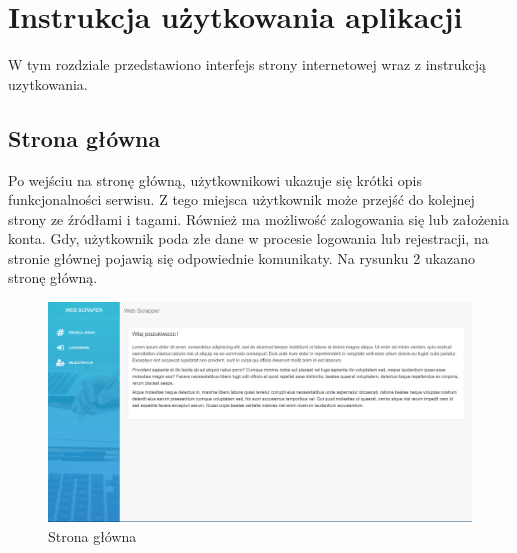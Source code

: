 \documentclass[12pt, titlepage]{article}
\begin{document}
	\newpage
	\section{Instrukcja użytkowania aplikacji}
	W tym rozdziale przedstawiono interfejs strony internetowej wraz z instrukcją uzytkowania.
	\subsection{Strona główna}
	Po wejściu na stronę główną, użytkownikowi ukazuje się krótki opis funkcjonalności serwisu. Z tego miejsca użytkownik może przejść do kolejnej strony ze źródłami i tagami. Również ma możliwość zalogowania się lub założenia konta. Gdy, użytkownik poda złe dane w procesie logowania lub rejestracji, na stronie głównej pojawią się odpowiednie komunikaty. Na rysunku 2 ukazano stronę główną.
	\begin{figure}[H]
		\centering
		\includegraphics[scale=0.45]{obrazki/stronaGlowna.png}
		\caption{Strona główna}
		\label{fig:db_schema}
	\end{figure}

	\newpage
\end{document}
